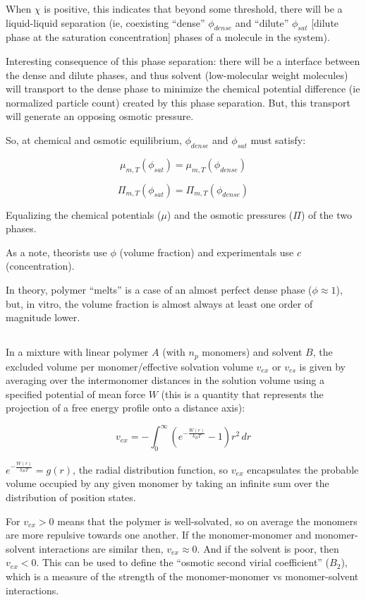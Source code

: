 \documentclass{article}
\begin{document}
When $\chi$ is positive, this indicates that beyond some threshold, there will be a liquid-liquid separation (ie, coexisting ``dense'' $\phi_{dense}$ and ``dilute'' $\phi_{sat}$ [dilute phase at the saturation concentration] phases of a molecule in the system).

Interesting consequence of this phase separation: there will be a interface between the dense and dilute phases, and thus solvent (low-molecular weight molecules) will transport to the dense phase to minimize the chemical potential difference (ie normalized particle count) created by this phase separation. But, this transport will generate an opposing osmotic pressure.

So, at chemical and osmotic equilibrium, $\phi_{dense}$ and $\phi_{sat}$ must satisfy:

\[\mu_{m,T}(\phi_{sat})=\mu_{m,T}(\phi_{dense})\]

\[\Pi_{m,T}(\phi_{sat})=\Pi_{m,T}(\phi_{dense})\]

Equalizing the chemical potentials ($\mu$) and the osmotic pressures ($\Pi$) of the two phases.

As a note, theorists use $\phi$ (volume fraction) and experimentals use $c$ (concentration).

In theory, polymer ``melts'' is a case of an almost perfect dense phase ($\phi\approx 1$), but, in vitro, the volume fraction is almost always at least one order of magnitude lower.

\subsection{}

In a mixture with linear polymer $A$ (with $n_p$ monomers) and solvent $B$, the excluded volume per monomer/effective solvation volume $v_{ex}$ or $v_{es}$ is given by averaging over the intermonomer distances in the solution volume using a specified potential of mean force $W$ (this is a quantity that represents the projection of a free energy profile onto a distance axis):

\[v_{ex}=-\int_0^{\infty}\left(e^{-\frac{W(r)}{k_B T}}-1\right) r^2\,dr\]

$e^{-\frac{W(r)}{k_B T}}=g(r)$, the radial distribution function, so $v_{ex}$ encapsulates the probable volume occupied by any given monomer by taking an infinite sum over the distribution of position states.

For $v_{ex}>0$ means that the polymer is well-solvated, so on average the monomers are more repulsive towards one another. If the monomer-monomer and monomer-solvent interactions are similar then, $v_{ex}\approx 0$. And if the solvent is poor, then $v_{ex}<0$. This can be used to define the ``osmotic second virial coefficient'' ($B_2$), which is a measure of the strength of the monomer-monomer vs monomer-solvent interactions.
\end{document}
